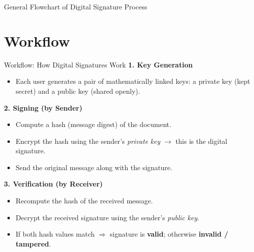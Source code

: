 \documentclass[aspectratio=169]{beamer}
\begin{document}
\begin{frame}{General Flowchart of Digital Signature Process}
{}
\end{frame}

\section{Workflow}
\begin{frame}{Workflow: How Digital Signatures Work}
  \textbf{1. Key Generation}
  \begin{itemize}
    \item Each user generates a pair of mathematically linked keys: a private key (kept secret) and a public key (shared openly).
  \end{itemize}
  \textbf{2. Signing (by Sender)}
  \begin{itemize}
    \item Compute a hash (message digest) of the document.
    \item Encrypt the hash using the sender's \emph{private key} $\rightarrow$ this is the digital signature.
    \item Send the original message along with the signature.
  \end{itemize}
  \textbf{3. Verification (by Receiver)}
  \begin{itemize}
    \item Recompute the hash of the received message.
    \item Decrypt the received signature using the sender's \emph{public key}.
    \item If both hash values match $\Rightarrow$ signature is \textbf{valid}; otherwise \textbf{invalid / tampered}.
  \end{itemize}
\end{frame}
\end{document}
